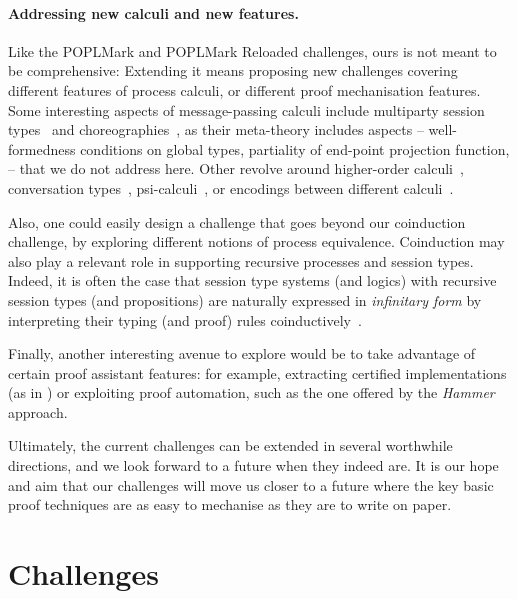 \documentclass[runningheads]{llncs}
\begin{document}
\paragraph{Addressing new calculi and new features.}
Like the POPLMark and POPLMark Reloaded challenges, ours
is not meant to be comprehensive: Extending it means proposing new
challenges covering different features of process calculi, or
different proof mechanisation features.  Some interesting aspects of
message-passing calculi include
multiparty session types~\cite{10.1145/2827695} and
choreographies~\cite{Carbone2013}, as their meta-theory includes
aspects -- \eg well-formedness conditions on global types, partiality
of end-point projection function, \etc -- that we do not address
here. Other revolve around higher-order calculi~\cite{Hirsch2022},
conversation types~\cite{DBLP:journals/tcs/CairesV10},
psi-calculi~\cite{lmcs:696}, or encodings between different
calculi~\cite{DBLP:journals/iandc/Gorla10,
  DBLP:conf/ecoop/ScalasDHY17}.

Also, one could easily design a challenge that goes beyond our
coinduction challenge, by exploring different notions of process equivalence.
%
Coinduction may also play a relevant role in supporting recursive processes and
session types. Indeed, it is often the case that session type systems (and
logics) with recursive session types (and propositions) are naturally expressed
in \emph{infinitary form} by interpreting their typing (and proof) rules
coinductively~\cite{BaeldeDoumaneSaurin16,DerakhshanPfenning22,HornePadovani23}.

Finally, another interesting avenue to explore would be to take
advantage of certain proof assistant features: for example, extracting
certified implementations (as in \cite{Castro-Perez2021}) or exploiting
proof automation, such as the one offered by the \emph{Hammer}
approach.

Ultimately, the current challenges can be extended in several worthwhile directions, and we look forward to a future when they indeed are.
It is our hope and aim that our challenges will move us closer to a future where the key basic proof techniques are as easy to mechanise as they are to write on paper.




\clearpage
\appendix
\section{Challenges}\label{app:challenges}

\end{document}
